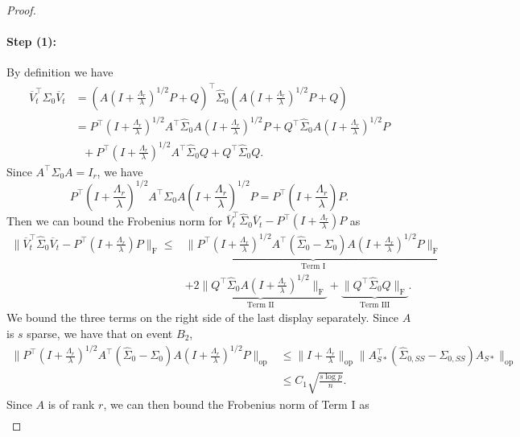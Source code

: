 \documentclass[11pt]{article}
\newcommand{\nb}[1]{\textcolor{orange}{\texttt{[#1]}}}
\newcommand{\gd}{\overline{V}}
\newcommand{\0}{{\mathbf{0}}}
\newcommand{\op}{{\mathrm{op}}}
\newcommand{\szerothird}{{\widehat{\Sigma}_0}}
\begin{document}
\begin{proof}
\paragraph{Step (1):} 
By definition we have 
 \begin{align*}
\gd_t^\top  \szerothird \gd_t & = 
\left(A\left(I+\frac{\Lambda_r}{\lambda}\right)^{1/2}P+Q\right)^\top \szerothird \left(A\left(I+\frac{\Lambda_r}{\lambda}\right)^{1/2}P+Q\right)\\
& = P^\top  \left(I+\frac{\Lambda_r}{\lambda}\right)^{1/2}A^\top  \szerothird A\left(I+\frac{\Lambda_r}{\lambda}\right)^{1/2}P+Q^\top  \szerothird A\left(I+\frac{\Lambda_r}{\lambda}\right)^{1/2}P \\
&~~~ +P^\top\left(I+\frac{\Lambda_r}{\lambda}\right)^{1/2}A^\top  \szerothird Q+Q^\top  \szerothird Q.
\end{align*}
Since $A^\top \Sigma_0 A = I_r$, we have\begin{equation*}
P^\top  \left(I+\frac{\Lambda_r}{\lambda}\right)^{1/2}A^\top  \Sigma_0 A\left(I+\frac{\Lambda_r}{\lambda}\right)^{1/2}P=P^\top\left(I+\frac{\Lambda_r}{\lambda}\right)P.
\end{equation*}
Then we can bound the Frobenius norm for $\gd_t^\top  \szerothird \gd_t-P^\top(I+\frac{\Lambda_r}{\lambda})P$ as \begin{align*}
\|\gd_t^\top  \szerothird \gd_t-P^\top(I+\frac{\Lambda_r}{\lambda})P\|_\mathrm{F}\leq&\underbrace{\|P^\top  (I+\frac{\Lambda_r}{\lambda})^{1/2}A^\top  (\szerothird-\Sigma_0) A(I+\frac{\Lambda_r}{\lambda})^{1/2}P\|_\mathrm{F}}_\text{{Term I}}\\
&+\underbrace{2\|Q^\top \szerothird A(I+\frac{\Lambda_r}{\lambda})^{1/2}\|_\mathrm{F}}_{\text{Term II}}+\underbrace{\|Q^\top  \szerothird Q\|_\mathrm{F}}_{\text{Term III}}.
\end{align*}
We bound the three terms on the right side of the last display separately. 
Since $A$ is $s$ sparse, we have that on event $B_2$,
\begin{align*}
\|P^\top  (I+\frac{\Lambda_r}{\lambda})^{1/2}A^\top  (\szerothird-\Sigma_0) A(I+\frac{\Lambda_r}{\lambda})^{1/2}P\|_\op&\leq \|I+\frac{\Lambda_r}{\lambda}\|_\op\|A_{S*}^\top(\widehat{\Sigma}_{0, SS}-\Sigma_{0,SS}) A_{S*}\|_\op\\
&\leq C_1\sqrt{\frac{s \log p }{n}}.
\end{align*}
Since $A$ is of rank $r$, we can then bound the Frobenius norm of Term I as \begin{align*}

\end{align*}
\end{proof}
\end{document}
